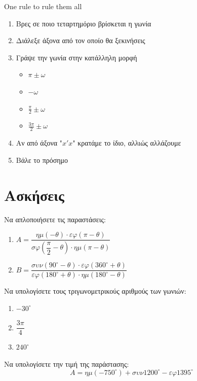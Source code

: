 \documentclass{presentation}
\begin{document}
\begin{frame}{One rule to rule them all}
  \begin{enumerate}[<+->]
    \item Βρες σε ποιο τεταρτημόριο βρίσκεται η γωνία
    \item Διάλεξε άξονα από τον οποίο θα ξεκινήσεις
    \item Γράψε την γωνία στην κατάλληλη μορφή
          \begin{itemize}
            \item $\pi \pm ω$
            \item $-ω$
            \item $\frac{\pi}{2}\pm ω$
            \item $\frac{3\pi}{2}\pm ω$
          \end{itemize}
    \item Αν από άξονα "$x'x$" κρατάμε το ίδιο, αλλιώς αλλάζουμε
    \item Βάλε το πρόσημο
  \end{enumerate}
\end{frame}

\moodle
\section{Ασκήσεις}

\begin{askisi}
  Να απλοποιήσετε τις παραστάσεις:
  \begin{enumerate}
    \item $Α = \dfrac{ημ(-θ) \cdot εφ(π - θ)}{σφ\left(\dfrac{π}{2} - θ\right) \cdot ημ(π - θ)}$
    \item $Β = \dfrac{συν(90^\circ - θ) \cdot εφ(360^\circ + θ)}{εφ(180^\circ + θ) \cdot ημ(180^\circ - θ)}$
  \end{enumerate}
\end{askisi}

\begin{askisi}
  Να υπολογίσετε τους τριγωνομετρικούς αριθμούς των γωνιών:
  \begin{enumerate}
    \item $-30^\circ$
    \item $\dfrac{3π}{4}$
    \item $240^\circ$
  \end{enumerate}
\end{askisi}

\begin{askisi}
  Να υπολογίσετε την τιμή της παράστασης:
  \[
    Α = ημ(-750^\circ) + συν 1200^\circ - εφ 1395^\circ
  \]
\end{askisi}
\end{document}

